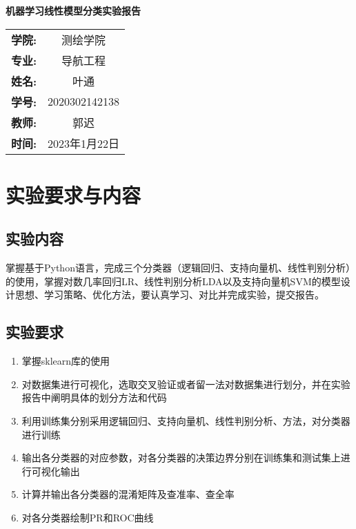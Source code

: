 \documentclass{ctexart}
\begin{document}
\newpage
\thispagestyle{empty}
    \begin{center}
        \Huge\textbf{机器学习线性模型分类实验报告}
    \end{center}
\vspace*{\fill}

\begin{table}[h]
    \centering
    \Large
    \begin{tabular}{cc}
    \textbf{学院:} & 测绘学院 \\ \cline{2-2}
    \textbf{专业:} & 导航工程 \\ \cline{2-2}
    \textbf{姓名:} & 叶通 \\  \cline{2-2}
    \textbf{学号:} & 2020302142138 \\ \cline{2-2}
    \textbf{教师:} & 郭迟 \\ \cline{2-2}
    \textbf{时间:} & 2023年1月22日 \\ \cline{2-2}
    \end{tabular}
\end{table}

\newpage
{}
\setcounter{page}{1}
\tableofcontents

\newpage
\setcounter{page}{1}

\section{实验要求与内容}
\subsection{实验内容}
掌握基于Python语言，完成三个分类器（逻辑回归、支持向量机、线性判别分析）的使用，掌握对数几率回归LR、线性判别分析LDA以及支持向量机SVM的模型设计思想、学习策略、优化方法，要认真学习、对比并完成实验，提交报告。
\subsection{实验要求}
\begin{enumerate}[(1)]
\item 掌握sklearn库的使用
\item 对数据集进行可视化，选取交叉验证或者留一法对数据集进行划分，并在实验报告中阐明具体的划分方法和代码
\item 利用训练集分别采用逻辑回归、支持向量机、线性判别分析、方法，对分类器进行训练
\item 输出各分类器的对应参数，对各分类器的决策边界分别在训练集和测试集上进行可视化输出
\item 计算并输出各分类器的混淆矩阵及查准率、查全率
\item 对各分类器绘制PR和ROC曲线
\end{enumerate}
\end{document}
